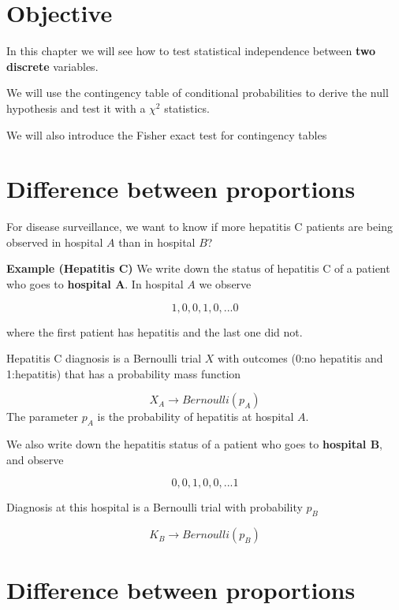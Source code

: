 \documentclass[
]{book}
\begin{document}
\hypertarget{objective-10}{%
\section{Objective}\label{objective-10}}

In this chapter we will see how to test statistical independence between \textbf{two discrete} variables.

We will use the contingency table of conditional probabilities to derive the null hypothesis and test it with a \(\chi^2\) statistics.

We will also introduce the Fisher exact test for contingency tables

\hypertarget{difference-between-proportions}{%
\section{Difference between proportions}\label{difference-between-proportions}}

For disease surveillance, we want to know if more hepatitis C patients are being observed in hospital \(A\) than in hospital \(B\)?

\textbf{Example (Hepatitis C)}
We write down the status of hepatitis C of a patient who goes to \textbf{hospital A}. In hospital \(A\) we observe

\[1, 0, 0, 1, 0, ... 0\]

where the first patient has hepatitis and the last one did not.

Hepatitis C diagnosis is a Bernoulli trial \(X\) with outcomes (0:no hepatitis and 1:hepatitis) that has a probability mass function

\[X_A \rightarrow Bernoulli (p_A)\]
The parameter \(p_A\) is the probability of hepatitis at hospital \(A\).

We also write down the hepatitis status of a patient who goes to \textbf{hospital B}, and observe

\[0, 0, 1, 0, 0, ... 1\]

Diagnosis at this hospital is a Bernoulli trial with probability \(p_B\)

\[K_B \rightarrow Bernoulli (p_B)\]

\hypertarget{difference-between-proportions-1}{%
\section{Difference between proportions}\label{difference-between-proportions-1}}
\end{document}
